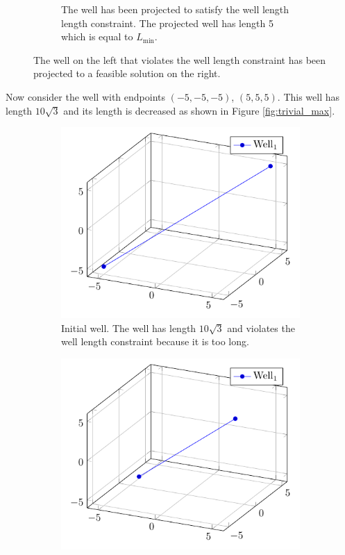 \begin{figure}[H]
\begin{subfigure}{0.44\textwidth}
		\caption{The well has been projected to satisfy the well length length constraint.
				  The projected well has length 5 which is equal to $L_{\min}$.}
		\label{fig:trivial_min_b}
	\end{subfigure}
	\caption{The well on the left that violates the well length constraint
			 has been projected to a feasible solution on the right.}
	\label{fig:trivial_min}
\end{figure}
%
%
Now consider the well with endpoints $(-5,-5,-5)$,
$(5,5,5)$. This well has length $10\sqrt{3}$ and its length
is decreased as shown in Figure \ref{fig:trivial_max}.
%
\begin{figure}[H]
	\centering
	\begin{subfigure}{0.44\textwidth}
		\centering
		\includegraphics[width=1\textwidth]{figures/trivial_projections/trivial_initial_max.pdf}
		\caption{Initial well. The well has length $10\sqrt{3}$ and violates the well length constraint
				  because it is too long.}
	\end{subfigure}\hfill
	\hspace{.05\linewidth}
	\begin{subfigure}{0.44\textwidth}
		\centering
		\includegraphics[width=1\textwidth]{figures/trivial_projections/trivial_max.pdf}

\end{subfigure}
\end{figure}
